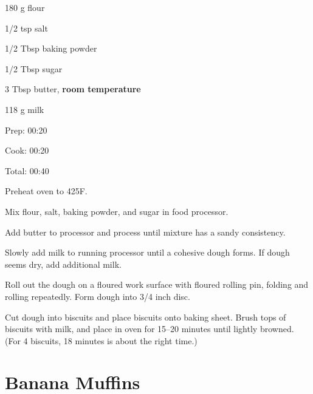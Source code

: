 \documentclass[oneside]{book}  %
\def\thisrecipe{}  %
\newcommand{\recipe}[1]{\section{#1}\def\thisrecipe{: #1}} %
\newcommand{\degF}{\textdegree F\xspace}
\begin{document}
\begin{IT}
  \begin{ingredients}[serves=4]
    \item[180 g] flour
    \item[1/2 tsp] salt
    \item[1/2 Tbsp] baking powder
    \item[1/2 Tbsp] sugar
    \item[3 Tbsp] butter, \textbf{room temperature}
    \item[118 g] milk
  \end{ingredients}

  \switchcolumn

  \begin{timeline}
    \item[Prep:]  00:20
    \item[Cook:]  00:20
    \item[Total:] 00:40
  \end{timeline}
\end{IT}

\begin{directions}
  \item Preheat oven to 425\degF.

  \item Mix flour, salt, baking powder, and sugar in food processor.

  \item Add butter to processor and process until mixture has a sandy
  consistency.

  \item Slowly add milk to running processor until a cohesive dough forms. If
  dough seems dry, add additional milk.

  \item Roll out the dough on a floured work surface with floured rolling pin,
  folding and rolling repeatedly. Form dough into 3/4 inch disc.

  \item Cut dough into biscuits and place biscuits onto baking sheet. Brush tops
  of biscuits with milk, and place in oven for 15--20 minutes until lightly
  browned. (For 4 biscuits, 18 minutes is about the right time.)
\end{directions}
\recipe{Banana Muffins} \label{recipe:banana_muffins} %
\end{document}
